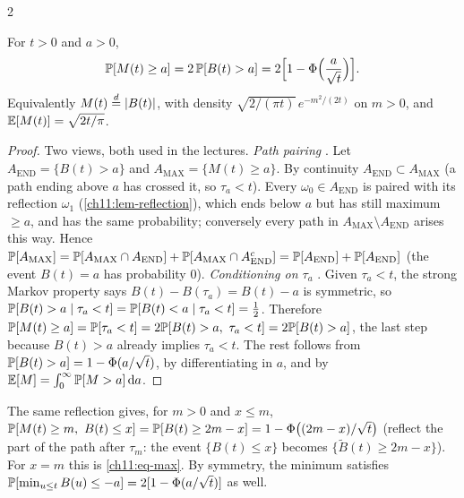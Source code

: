 \begin{paracol}{2}
\begin{proposition}\label{ch11:prop-max}
For $t>0$ and $a>0$,
\begin{equation}\label{ch11:eq-max}
  \mathbb{P}[M(t)\ge a]=2\,\mathbb{P}[B(t)>a]=2\Bigl[1-\Phi\Bigl(\frac a{\sqrt t}\Bigr)\Bigr].
\end{equation}
Equivalently $M(t)\stackrel{d}{=}|B(t)|$, with density $\sqrt{2/(\pi t)}\,e^{-m^2/(2t)}$ on $m>0$, and $\mathbb{E}[M(t)]=\sqrt{2t/\pi}$.
\end{proposition}
\begin{proof}
Two views, both used in the lectures.
\emph{Path pairing} . Let $A_{\mathrm{END}}=\{B(t)>a\}$ and $A_{\mathrm{MAX}}=\{M(t)\ge a\}$.
By continuity $A_{\mathrm{END}}\subset A_{\mathrm{MAX}}$ (a path ending above $a$ has crossed it, so $\tau_a<t$). Every
$\omega_0\in A_{\mathrm{END}}$ is paired with its reflection $\omega_1$ (\cref{ch11:lem-reflection}), which
ends below $a$ but has still maximum $\ge a$, and has the same probability; conversely every path in $A_{\mathrm{MAX}}\setminus A_{\mathrm{END}}$
arises this way. Hence $\mathbb{P}[A_{\mathrm{MAX}}]=\mathbb{P}[A_{\mathrm{MAX}}\cap A_{\mathrm{END}}]+\mathbb{P}[A_{\mathrm{MAX}}\cap A_{\mathrm{END}}^c]
=\mathbb{P}[A_{\mathrm{END}}]+\mathbb{P}[A_{\mathrm{END}}]$ (the event $B(t)=a$ has probability $0$).
\emph{Conditioning on $\tau_a$} . Given $\tau_a<t$, the strong Markov property says $B(t)-B(\tau_a)=B(t)-a$
is symmetric, so $\mathbb{P}[B(t)>a\mid\tau_a<t]=\mathbb{P}[B(t)<a\mid\tau_a<t]=\tfrac12$. Therefore
$\Prob[M(t)\ge a]=\Prob[\tau_a<t]=2\Prob[B(t)>a,\ \tau_a<t]=2\Prob[B(t)>a]$, the last step because $B(t)>a$ already
implies $\tau_a<t$.
The rest follows from $\mathbb{P}[B(t)>a]=1-\Phi(a/\sqrt t)$, by differentiating in $a$, and by $\mathbb{E}[M]=\int_0^\infty\mathbb{P}[M>a]\,\mathrm{d} a$.
\end{proof}

\begin{remark}\label{ch11:rem-joint}
The same reflection gives, for $m>0$ and $x\le m$, $\mathbb{P}[M(t)\ge m,\ B(t)\le x]=\mathbb{P}[B(t)\ge2m-x]=1-\Phi\bigl((2m-x)/\sqrt t\bigr)$
(reflect the part of the path after $\tau_m$: the event $\{B(t)\le x\}$ becomes $\{\widetilde B(t)\ge2m-x\}$).
For $x=m$ this is \eqref{ch11:eq-max}. By symmetry, the minimum satisfies $\mathbb{P}[\min_{u\le t}B(u)\le-a]=2[1-\Phi(a/\sqrt t)]$
as well.
\end{remark}


\end{paracol}
